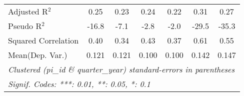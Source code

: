 \begin{tabular}{lcccccc}
   Adjusted R$^2$                                             & 0.25    & 0.23    & 0.24    & 0.22         & 0.31    & 0.27\\  
   Pseudo R$^2$                                               & -16.8   & -7.1    & -2.8    & -2.0         & -29.5   & -35.3\\  
   Squared Correlation                                        & 0.40    & 0.34    & 0.43    & 0.37         & 0.61    & 0.55\\  
Mean(Dep. Var.) & 0.121 & 0.121 & 0.100 & 0.100 & 0.142 & 0.147 \\
   \midrule \midrule
   \multicolumn{7}{l}{\emph{Clustered (pi\_id \& quarter\_year) standard-errors in parentheses}}\\
   \multicolumn{7}{l}{\emph{Signif. Codes: ***: 0.01, **: 0.05, *: 0.1}}\\
\end{tabular}
\par\endgroup
